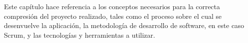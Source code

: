 Este capítulo hace referencia a los conceptos necesarios para la correcta compresión del proyecto realizado, tales como el proceso sobre el cual se desenvuelve la aplicación, la metodología de desarrollo de software, en este caso Scrum, y las tecnologías y herramientas a utilizar.



